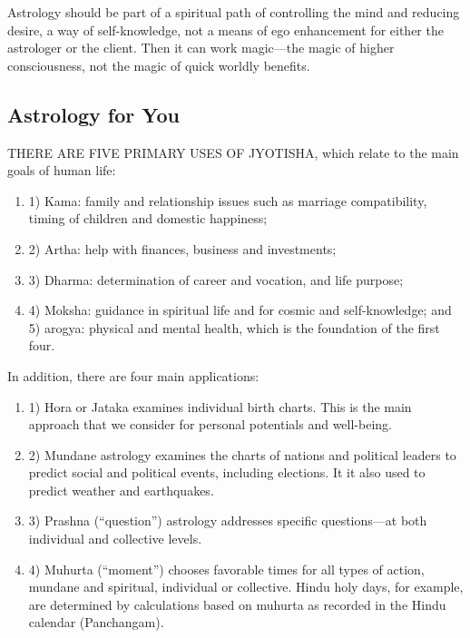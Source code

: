 Astrology should be part of a spiritual path of controlling the mind and reducing desire, a way of self-knowledge, not a means of ego enhancement for either the astrologer or the client. Then it can work magic—the magic of higher consciousness, not the magic of quick worldly benefits.

 

\subsection{Astrology for You}

THERE ARE FIVE PRIMARY USES OF JYOTISHA, which relate to the main goals of human life: 

\begin{enumerate}
\item[] 1) Kama: family and relationship issues such as marriage compatibility, timing of children and domestic happiness; 
\item[] 2) Artha: help with finances, business and investments; 
\item[] 3) Dharma: determination of career and vocation, and life purpose; 
\item[] 4) Moksha: guidance in spiritual life and for cosmic and self-knowledge; and 5) arogya: physical and mental health, which is the foundation of the first four.
\end{enumerate}

 

In addition, there are four main applications: 
\begin{enumerate}
\item[] 1) Hora or Jataka examines individual birth charts. This is the main approach that we consider for personal potentials and well-being. 

\item[] 2) Mundane astrology examines the charts of nations and political leaders to predict social and political events, including elections. It it also used to predict weather and earthquakes. 

\item[] 3) Prashna (“question”) astrology addresses specific questions—at both individual and collective levels. 

\item[] 4) Muhurta (“moment”) chooses favorable times for all types of action, mundane and spiritual, individual or collective. Hindu holy days, for example, are determined by calculations based on muhurta as recorded in the Hindu calendar (Panchangam).
\end{enumerate}

